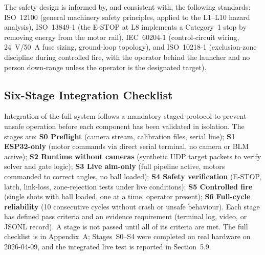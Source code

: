 The safety design is informed by, and consistent with, the following standards: ISO~12100 \cite{ref22} (general machinery safety principles, applied to the L1--L10 hazard analysis), ISO~13849-1 \cite{ref44_iso13849} (the E-STOP at L8 implements a Category~1 stop by removing energy from the motor rail), IEC~60204-1 \cite{ref45_iec60204} (control-circuit wiring, 24~V/50~A fuse sizing, ground-loop topology), and ISO~10218-1 \cite{ref26} (exclusion-zone discipline during controlled fire, with the operator behind the launcher and no person down-range unless the operator is the designated target).

\subsection{Six-Stage Integration Checklist}

Integration of the full system follows a mandatory staged protocol to prevent unsafe operation before each component has been validated in isolation. The stages are: \textbf{S0 Preflight} (camera stream, calibration files, serial line); \textbf{S1 ESP32-only} (motor commands via direct serial terminal, no camera or BLM active); \textbf{S2 Runtime without cameras} (synthetic UDP target packets to verify solver and gate logic); \textbf{S3 Live aim-only} (full pipeline active, motors commanded to correct angles, no ball loaded); \textbf{S4 Safety verification} (E-STOP, latch, link-loss, zone-rejection tests under live conditions); \textbf{S5 Controlled fire} (single shots with ball loaded, one at a time, operator present); \textbf{S6 Full-cycle reliability} (10 consecutive cycles without crash or unsafe behaviour). Each stage has defined pass criteria and an evidence requirement (terminal log, video, or JSONL record). A stage is not passed until all of its criteria are met. The full checklist is in Appendix~A; Stages~S0--S4 were completed on real hardware on 2026-04-09, and the integrated live test is reported in Section~5.9.
